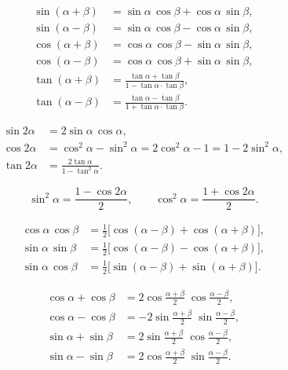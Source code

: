 \documentclass[12pt,a4paper]{article}
\begin{document}
\begin{congthuc}[title={Công thức cộng}]
  \begin{align}
    \sin(\alpha + \beta) &= \sin\alpha\,\cos\beta + \cos\alpha\,\sin\beta, \\
    \sin(\alpha - \beta) &= \sin\alpha\,\cos\beta - \cos\alpha\,\sin\beta, \\
    \cos(\alpha + \beta) &= \cos\alpha\,\cos\beta - \sin\alpha\,\sin\beta, \\
    \cos(\alpha - \beta) &= \cos\alpha\,\cos\beta + \sin\alpha\,\sin\beta, \\[4pt]
    \tan(\alpha + \beta) &= \frac{\tan\alpha + \tan\beta}{1 - \tan\alpha\cdot\tan\beta}, \\[4pt]
    \tan(\alpha - \beta) &= \frac{\tan\alpha - \tan\beta}{1 + \tan\alpha\cdot\tan\beta}.
  \end{align}
\end{congthuc}

\begin{congthuc}[title={Công thức nhân đôi}]
  \begin{align}
    \sin 2\alpha &= 2\sin\alpha\,\cos\alpha, \\
    \cos 2\alpha &= \cos^2\alpha - \sin^2\alpha = 2\cos^2\alpha - 1 = 1 - 2\sin^2\alpha, \\[4pt]
    \tan 2\alpha &= \frac{2\tan\alpha}{1 - \tan^2\alpha}.
  \end{align}
\end{congthuc}

\begin{congthuc}[title={Công thức hạ bậc}]
  \[
    \sin^2\alpha = \frac{1 - \cos 2\alpha}{2},\qquad
    \cos^2\alpha = \frac{1 + \cos 2\alpha}{2}.
  \]
\end{congthuc}

\begin{congthuc}[title={Biến đổi tích thành tổng}]
  \begin{align}
    \cos\alpha\,\cos\beta &= \tfrac{1}{2}\bigl[\cos(\alpha - \beta) + \cos(\alpha + \beta)\bigr], \\
    \sin\alpha\,\sin\beta &= \tfrac{1}{2}\bigl[\cos(\alpha - \beta) - \cos(\alpha + \beta)\bigr], \\
    \sin\alpha\,\cos\beta &= \tfrac{1}{2}\bigl[\sin(\alpha - \beta) + \sin(\alpha + \beta)\bigr].
  \end{align}
\end{congthuc}

\begin{congthuc}[title={Biến đổi tổng thành tích}]
  \begin{align}
    \cos\alpha + \cos\beta &= 2\cos\frac{\alpha + \beta}{2}\;\cos\frac{\alpha - \beta}{2}, \\
    \cos\alpha - \cos\beta &= -2\sin\frac{\alpha + \beta}{2}\;\sin\frac{\alpha - \beta}{2}, \\
    \sin\alpha + \sin\beta &= 2\sin\frac{\alpha + \beta}{2}\;\cos\frac{\alpha - \beta}{2}, \\
    \sin\alpha - \sin\beta &= 2\cos\frac{\alpha + \beta}{2}\;\sin\frac{\alpha - \beta}{2}.
  \end{align}
\end{congthuc}
\end{document}
